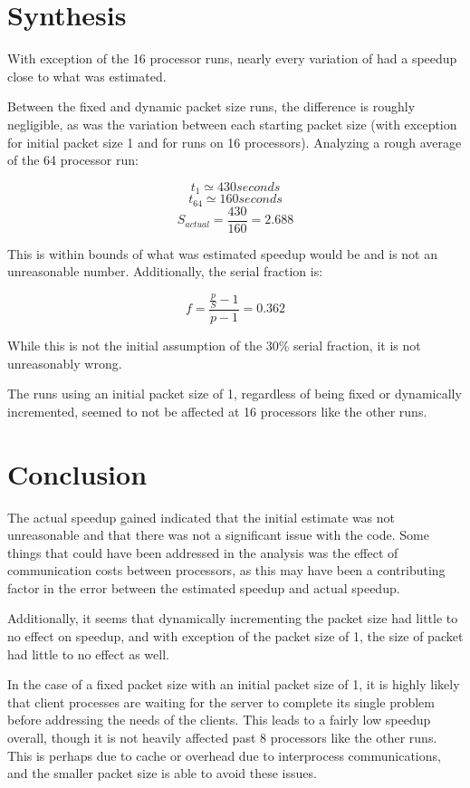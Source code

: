 \documentclass{article}
\begin{document}
  \section{Synthesis}

  With exception of the 16 processor runs, nearly every variation of had a 
  speedup close to what was estimated.

  Between the fixed and dynamic packet size runs, the difference is roughly
  negligible, as was the variation between each starting packet size (with
  exception for initial packet size 1 and for runs on 16 processors). Analyzing
  a rough average of the 64 processor run:

  \[ t_1 \simeq 430 seconds \]
  \[ t_64 \simeq 160 seconds \]
  \[ S_{actual} = \frac{430}{160} = 2.688 \]

  This is within bounds of what was estimated speedup would be and is not an 
  unreasonable number. Additionally, the serial fraction is:

  \[ f = \frac{\frac{p}{S}-1}{p-1} = 0.362 \]

  While this is not the initial assumption of the 30\% serial fraction, it is
  not unreasonably wrong.

  The runs using an initial packet size of 1, regardless of being fixed or
  dynamically incremented, seemed to not be affected at 16 processors like the
  other runs.

  \section{Conclusion}

  The actual speedup gained indicated that the initial estimate was not
  unreasonable and that there was not a significant issue with the code. Some
  things that could have been addressed in the analysis was the effect of
  communication costs between processors, as this may have been a contributing
  factor in the error between the estimated speedup and actual speedup.

  Additionally, it seems that dynamically incrementing the packet size had
  little to no effect on speedup, and with exception of the packet size of 1,
  the size of packet had little to no effect as well.

  In the case of a fixed packet size with an initial packet size of 1, it is
  highly likely that client processes are waiting for the server to complete
  its single problem before addressing the needs of the clients. This leads
  to a fairly low speedup overall, though it is not heavily affected past
  8 processors like the other runs. This is perhaps due to cache or overhead
  due to interprocess communications, and the smaller packet size is able to
  avoid these issues.
\end{document}
